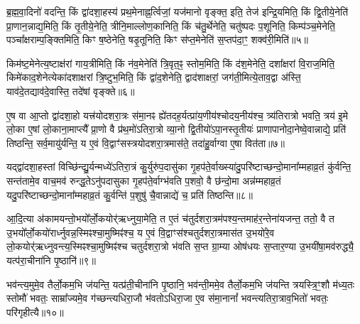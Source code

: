{\anuvakamend[{व्याह॒ स दृ॑शी॒कवो᳚\-ऽर्चि॒तारः॒ स एक॑ञ्च॥१॥}]}

ब्र॒ह्म॒वा॒दिनो॑ वदन्ति॒ किं द्वा॑दशा॒हस्य॑ प्रथ॒मेनाह्न॒र्त्विजां॒ यज॑मानो वृङ्क्त॒ इति॒ तेज॑ इन्द्रि॒यमिति॒ किं द्वि॒तीये॒नेति॑ प्रा॒णान॒न्नाद्य॒मिति॒ किं तृ॒तीये॒नेति॒ त्रीनि॒माल्लोण॒कानिति॒ किं च॑तु॒र्थेनेति॒ चतु॑ष्पदः प॒शूनिति॒ किम्प॑ञ्च॒मेनेति॒ पञ्चा᳚क्षराम्प॒ङ्क्तिमिति॒ किꣳ ष॒ष्ठेनेति॒ षडृ॒तूनिति॒ किꣳ स॑प्त॒मेनेति॑ स॒प्तप॑दा॒ꣳ॒ शक्व॑री॒मिति॑॥५॥

किम॑ष्ट॒मेनेत्य॒ष्टाक्ष॑रां गाय॒त्रीमिति॒ किं न॑व॒मेनेति॑ त्रि॒वृत॒ꣴ॒ स्तोम॒मिति॒ किं द॑श॒मेनेति॒ दशा᳚क्षरां वि॒राज॒मिति॒ किमे॑काद॒शेनेत्येका॑दशाक्षरां त्रि॒ष्टुभ॒मिति॒ किं द्वा॑द॒शेनेति॒ द्वाद॑शाक्षरां॒ जग॑ती॒मित्ये॒ताव॒द्वा अ॑स्ति॒ याव॑दे॒तद्याव॑दे॒वास्ति॒ तदे॑षां वृङ्क्ते॥६॥

{\anuvakamend[{शक्व॑री॒मित्येक॑चत्वारिꣳशच्च॥२॥}]}

ए॒ष वा आ॒प्तो द्वा॑दशा॒हो यत्त्र॑योदशरा॒त्रः स॑मा॒नꣴ ह्ये॑तदह॒र्यत्प्रा॑य॒णीय॑श्चोदय॒नीय॑श्च॒ त्र्य॑तिरात्रो भवति॒ त्रय॑ इ॒मे लो॒का ए॒षां लो॒काना॒माप्त्यै᳚ प्रा॒णो वै प्र॑थ॒मो॑\-ऽतिरा॒त्रो व्या॒नो द्वि॒तीयो॑\-ऽपा॒नस्तृ॒तीयः॑ प्राणापानोदा॒नेष्वे॒वान्नाद्ये॒ प्रति॑ तिष्ठन्ति॒ सर्व॒मायु॑र्यन्ति॒ य ए॒वं वि॒द्वाꣳ॑सस्त्रयोदशरा॒त्रमास॑ते॒ तदा॑हु॒र्वाग्वा ए॒षा वित॑ता॥७॥

यद्द्वा॑दशा॒हस्तां विच्छि॑न्द्यु॒र्यन्मध्ये॑\-ऽतिरा॒त्रं कु॒र्युरु॑प॒दासु॑का गृ॒हप॑ते॒र्वाख्स्या॑दु॒परि॑ष्टाच्छन्दो॒माना᳚म्महाव्र॒तं कु॑र्वन्ति॒ सन्त॑तामे॒व वाच॒मव॑ रुन्द्ध॒ते\-ऽनु॑पदासुका गृ॒हप॑ते॒र्वाग्भ॑वति प॒शवो॒ वै छ॑न्दो॒मा अन्न॑म्महाव्र॒तं यदु॒परि॑ष्टाच्छन्दो॒माना᳚\-म्महाव्र॒तं कु॒र्वन्ति॑ प॒शुषु॑ चै॒वान्नाद्ये॑ च॒ प्रति॑ तिष्ठन्ति॥८॥

{\anuvakamend[{वित॑ता॒ त्रिच॑त्वारिꣳशच्च॥३॥}]}

आ॒दि॒त्या अ॑कामयन्तो॒भयो᳚र्लो॒कयोर्॑ऋध्नुया॒मेति॒ त ए॒तं च॑तुर्दशरा॒त्रम॑पश्य॒न्तमाह॑र॒न्तेना॑यजन्त॒ ततो॒ वै त उ॒भयो᳚र्लो॒कयो॑रार्ध्नुवन्न॒स्मिꣴश्चा॒मुष्मिꣴ॑श्च॒ य ए॒वं वि॒द्वाꣳस॑श्चतुर्दशरा॒त्रमास॑त उ॒भयो॑रे॒व लो॒कयोर्\mbox{}॑ऋध्नुवन्त्य॒\-स्मिꣴश्चा॒मुष्मिꣴ॑श्च चतुर्दशरा॒त्रो भ॑वति स॒प्त ग्रा॒म्या ओष॑धयः स॒प्तार॒ण्या उ॒भयी॑षा॒मव॑रुद्ध्यै॒ यत्प॑रा॒चीना॑नि पृ॒ष्ठानि॑॥९॥

भव॑न्त्य॒मुमे॒व तैर्लो॒कम॒भि ज॑यन्ति॒ यत्प्र॑ती॒चीना॑नि पृ॒ष्ठानि॒ भव॑न्ती॒ममे॒व तैर्लो॒कम॒भि ज॑यन्ति त्रयस्त्रि॒ꣳ॒शौ म॑ध्य॒तः स्तोमौ॑ भवतः॒ साम्रा᳚ज्यमे॒व ग॑च्छन्त्यधिरा॒जौ भ॑वतो\-ऽधिरा॒जा ए॒व स॑मा॒नानां᳚ भवन्त्यतिरा॒त्राव॒भितो॑ भवतः॒ परि॑गृहीत्यै॥१०॥

{\anuvakamend[{पृ॒ष्ठानि॒ चतु॑स्त्रिꣳशच्च॥४॥}]}

